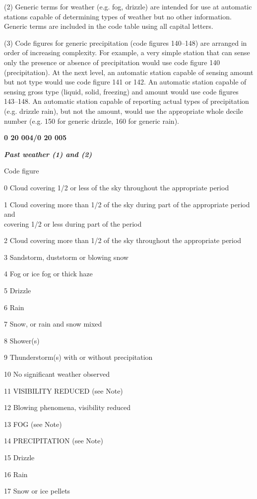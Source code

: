 (2) Generic terms for weather (e.g. fog, drizzle) are intended for use at automatic stations capable of determining types of weather but no other information. Generic terms are included in the code table using all capital letters.

(3) Code figures for generic precipitation (code figures 140--148) are arranged in order of increasing complexity. For example, a very simple station that can sense only the presence or absence of precipitation would use code figure 140 (precipitation). At the next level, an automatic station capable of sensing amount but not type would use code figure 141 or 142. An automatic station capable of sensing gross type (liquid, solid, freezing) and amount would use code figures 143--148. An automatic station capable of reporting actual types of precipitation (e.g. drizzle rain), but not the amount, would use the appropriate whole decile number (e.g. 150 for generic drizzle, 160 for generic rain).

\textbf{0 20 004/0 20 005}

\emph{\textbf{Past weather (1) and (2)}}

Code figure

0 Cloud covering 1/2 or less of the sky throughout the appropriate period

1 Cloud covering more than 1/2 of the sky during part of the appropriate period and\\
covering 1/2 or less during part of the period

2 Cloud covering more than 1/2 of the sky throughout the appropriate period

3 Sandstorm, duststorm or blowing snow

4 Fog or ice fog or thick haze

5 Drizzle

6 Rain

7 Snow, or rain and snow mixed

8 Shower(s)

9 Thunderstorm(s) with or without precipitation

10 No significant weather observed

11 VISIBILITY REDUCED (see Note)

12 Blowing phenomena, visibility reduced

13 FOG (see Note)

14 PRECIPITATION (see Note)

15 Drizzle

16 Rain

17 Snow or ice pellets

